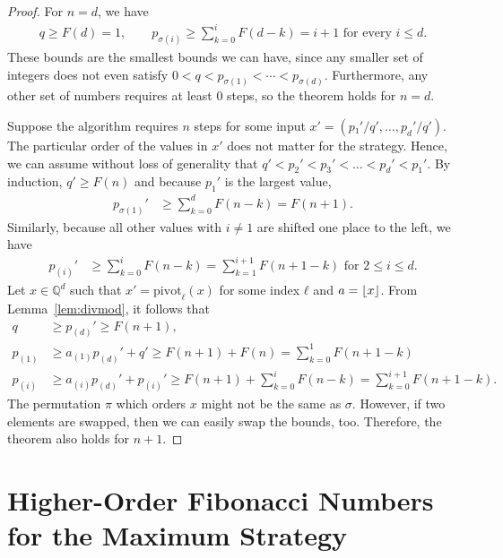 \begin{proof}
  For $n = d$, we have
  \begin{align*}
    q ≥ F(d) = 1,
    \qquad
    p_{σ(i)} ≥ \sum_{k=0}^i F(d - k) = i + 1 \text{ for every } i ≤ d.
  \end{align*}
  These bounds are the smallest bounds we can have, since any smaller set of
  integers does not even satisfy $0 < q < p_{σ(1)} < ⋯ < p_{σ(d)}$.
  Furthermore, any other set of numbers requires at least $0$ steps, so
  the theorem holds for $n = d$.

  Suppose the algorithm requires $n$ steps for some input $x' = (p₁'/q', …, p_d'/q')$.
  The particular order of the values in $x'$ does not matter for the strategy.
  Hence, we can assume without loss of generality that $q' < p_2' < p_3' < … < p_d' < p_1'$.
  By induction, $q' ≥ F(n)$ and because $p_1'$ is the largest value,
  \begin{align*}
    p_{σ(1)}' & ≥ \sum_{k=0}^d F(n - k) = F(n + 1).
  \end{align*}
  Similarly, because all other values with $i ≠ 1$ are shifted one place to the
  left, we have
  \begin{align*}
    p_{(i)}' & ≥ \sum_{k=0}^i F(n - k) = \sum_{k=1}^{i+1} F(n + 1 - k) \text{ for } 2 ≤ i ≤ d.
  \end{align*}
  Let $x ∈ ℚ^d$ such that $x' = \mathrm{pivot}_ℓ(x)$ for some index $ℓ$ and $a = \left\lfloor x\right\rfloor$.
  From Lemma~\ref{lem:divmod}, it follows that
  \begin{align*}
    q
    & ≥ p_{(d)}' ≥ F(n+1), \\
    p_{(1)}
    & ≥ a_{(1)} p_{(d)}' + q' ≥ F(n + 1) + F(n) = \sum_{k=0}^1 F(n + 1 - k) \\
    p_{(i)}
    & ≥ a_{(i)} p_{(d)}' + p_{(i)}' ≥ F(n + 1) + ∑_{k=0}^i F(n - k) = ∑_{k=0}^{i+1} F(n + 1 - k).
  \end{align*}
  The permutation $π$ which orders $x$ might not be the same as $σ$.
  However, if two elements are swapped, then we can easily swap the bounds, too.
  Therefore, the theorem also holds for $n+1$.
\end{proof}

\section{Higher-Order Fibonacci Numbers for the Maximum Strategy}

